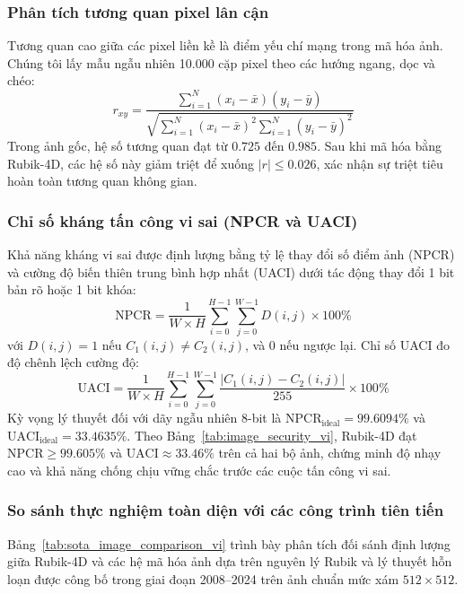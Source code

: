 \documentclass[10pt,twocolumn]{article}
\begin{document}
\subsubsection{Phân tích tương quan pixel lân cận}
Tương quan cao giữa các pixel liền kề là điểm yếu chí mạng trong mã hóa ảnh. Chúng tôi lấy mẫu ngẫu nhiên 10.000 cặp pixel theo các hướng ngang, dọc và chéo:
\begin{equation}
    r_{xy} = \frac{\sum_{i=1}^{N} (x_i - \bar{x})(y_i - \bar{y})}{\sqrt{\sum_{i=1}^{N}(x_i - \bar{x})^2 \sum_{i=1}^{N}(y_i - \bar{y})^2}}
\end{equation}
Trong ảnh gốc, hệ số tương quan đạt từ $0.725$ đến $0.985$. Sau khi mã hóa bằng Rubik-4D, các hệ số này giảm triệt để xuống $|r| \le 0.026$, xác nhận sự triệt tiêu hoàn toàn tương quan không gian.

\subsubsection{Chỉ số kháng tấn công vi sai (NPCR và UACI)}
Khả năng kháng vi sai được định lượng bằng tỷ lệ thay đổi số điểm ảnh (NPCR) và cường độ biến thiên trung bình hợp nhất (UACI) dưới tác động thay đổi 1 bit bản rõ hoặc 1 bit khóa:
\begin{equation}
    \text{NPCR} = \frac{1}{W \times H} \sum_{i=0}^{H-1} \sum_{j=0}^{W-1} D(i, j) \times 100\%
\end{equation}
với $D(i, j) = 1$ nếu $C_1(i, j) \neq C_2(i, j)$, và $0$ nếu ngược lại. Chỉ số UACI đo độ chênh lệch cường độ:
\begin{equation}
    \text{UACI} = \frac{1}{W \times H} \sum_{i=0}^{H-1} \sum_{j=0}^{W-1} \frac{|C_1(i, j) - C_2(i, j)|}{255} \times 100\%
\end{equation}
Kỳ vọng lý thuyết đối với dãy ngẫu nhiên 8-bit là $\text{NPCR}_{\text{ideal}} = 99.6094\%$ và $\text{UACI}_{\text{ideal}} = 33.4635\%$. Theo Bảng~\ref{tab:image_security_vi}, Rubik-4D đạt $\text{NPCR} \ge 99.605\%$ và $\text{UACI} \approx 33.46\%$ trên cả hai bộ ảnh, chứng minh độ nhạy cao và khả năng chống chịu vững chắc trước các cuộc tấn công vi sai.

\subsubsection{So sánh thực nghiệm toàn diện với các công trình tiên tiến}
Bảng~\ref{tab:sota_image_comparison_vi} trình bày phân tích đối sánh định lượng giữa Rubik-4D và các hệ mã hóa ảnh dựa trên nguyên lý Rubik và lý thuyết hỗn loạn được công bố trong giai đoạn 2008--2024 trên ảnh chuẩn mức xám $512 \times 512$.
\end{document}
